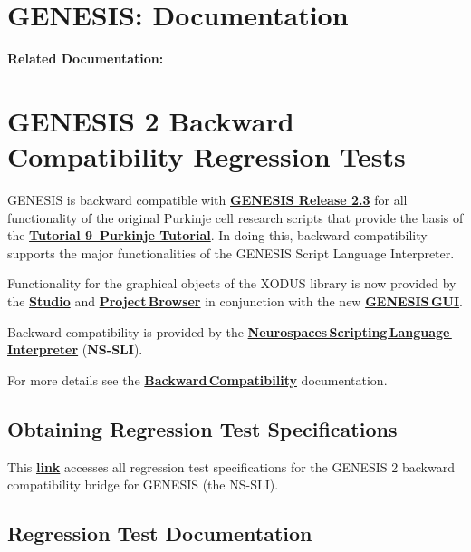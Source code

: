 \documentclass[12pt]{article}
\begin{document}
\section*{GENESIS: Documentation}

{\bf Related Documentation:}

\section*{GENESIS 2 Backward Compatibility Regression Tests}

GENESIS is backward compatible with \href{http://genesis-sim.org/GENESIS/genesis-ftp/}{\bf GENESIS Release 2.3} for all functionality of the original Purkinje cell research scripts that provide the basis of the \href{http://genesis-sim.org/GENESIS/illtuts/purkinje.html}{\bf Tutorial 9--Purkinje Tutorial}. In doing this, backward compatibility supports the major functionalities of the GENESIS Script Language Interpreter.

Functionality for the graphical objects of the XODUS library is now provided by the \href{../studio/studio.tex}{\bf Studio} and \href{../project-browser/project-browser.tex}{\bf Project\,Browser} in conjunction with the new \href{../gtube/gtube.tex}{\bf GENESIS\,GUI}.

Backward compatibility is provided by the \href{../nssli/nssli.tex}{\bf Neurospaces\,Scripting\,Language\,Interpreter} ({\bf NS-SLI}).

For more details see the \href{../backward-compatibility/backward-compatibility.tex}{\bf Backward\,Compatibility} documentation.

\subsection*{Obtaining Regression Test Specifications}

This \href{http://www.neurospaces.org/neurospaces_project/ns-sli/tests/html/index.html}{\bf link} accesses all regression test specifications for the GENESIS 2 backward compatibility bridge for GENESIS (the NS-SLI).

\subsection*{Regression Test Documentation}
\end{document}
